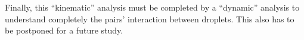 Finally, this ``kinematic'' analysis must be completed by a ``dynamic'' analysis to understand completely the pairs' interaction between droplets. 
This also has to be postponed for a future study. 



